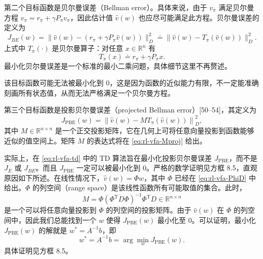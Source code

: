 第二个目标函数是贝尔曼误差（Bellman error）。具体来说，由于 $v_{\pi}$ 满足贝尔曼方程 $v_{\pi} = r_{\pi} + \gamma P_{\pi}v_{\pi}$，因此估计值 $\hat{v}(w)$ 也应尽可能满足此方程。贝尔曼误差的定义为
\begin{equation}
J_{BE}(w) = \| \hat{v}(w) - (r_{\pi} + \gamma P_{\pi} \hat{v}(w)) \|_{D}^{2} \doteq \| \hat{v}(w) - T_{\pi}(\hat{v}(w)) \|_{D}^{2}.
\label{eq:rl-vfa-jbe}
\end{equation}
上式中 $T_{\pi}(\cdot)$ 是贝尔曼算子：对任意 $x \in \mathbb{R}^n$ 有
\begin{equation*}
T_{\pi}(x) \doteq r_{\pi} + \gamma P_{\pi} x.
\end{equation*}
最小化贝尔曼误差是一个标准的最小二乘问题，具体细节这里不再赘述。

该目标函数可能无法被最小化到 $0$，这是因为函数的近似能力有限，不一定能准确刻画所有状态值，从而无法严格满足一个贝尔曼方程。

第三个目标函数是投影贝尔曼误差（projected Bellman error）[50--54]，其定义为
\begin{equation*}
J_{\mathrm{PBE}}(w) = \left\| \hat{v}(w) - M T_{\pi}(\hat{v}(w)) \right\|_{D}^{2},
\end{equation*}
其中 $M \in \mathbb{R}^{n \times n}$ 是一个正交投影矩阵，它在几何上可将任意向量投影到函数能够近似的值空间上。矩阵 $M$ 的表达式将在 \cref{eq:rl-vfa-Mproj} 给出。

实际上，在 \cref{eq:rl-vfa-td} 中的 TD 算法旨在最小化投影贝尔曼误差 $J_{\mathrm{PBE}}$，而不是 $J_{E}$ 或 $J_{BE}$。而且 $J_{\mathrm{PBE}}$ 一定可以被最小化到 $0$。严格的数学证明见方框 8.5，直观原因如下所述。在线性情况下，$\hat{v}(w)=\Phi w$，其中 $\Phi$ 已经在 \cref{eq:rl-vfa-PhiD} 中给出。$\Phi$ 的列空间（range space）是该线性函数所有可能取值的集合。此时，
\begin{equation}
M = \Phi (\Phi^{\mathrm{T}} D \Phi)^{-1} \Phi^{\mathrm{T}} D \in \mathbb{R}^{n \times n}
\label{eq:rl-vfa-Mproj}
\end{equation}
是一个可以将任意向量投影到 $\Phi$ 的列空间的投影矩阵。由于 $\hat{v}(w)$ 在 $\Phi$ 的列空间中，因此我们总能找到一个 $w$ 使得 $J_{\mathrm{PBE}}(w)$ 最小化至 $0$。可以证明，最小化 $J_{\mathrm{PBE}}(w)$ 的解就是 $w^{*} = A^{-1}b$，即
\begin{equation*}
w^{*} = A^{-1} b = \arg \min_{w} J_{\mathrm{PBE}}(w).
\end{equation*}
具体证明见方框 8.5。

